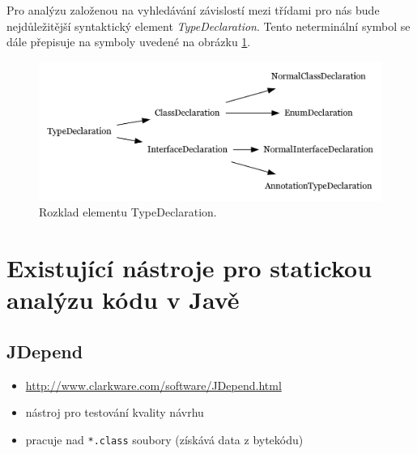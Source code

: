 Pro analýzu založenou na vyhledávání závislostí mezi třídami pro nás bude nejdůležitější syntaktický element \emph{TypeDeclaration}. Tento neterminální symbol se dále přepisuje na symboly uvedené na obrázku \ref{type_declaration_options}.

\begin{figure}[h!]
\centering
\includegraphics[width=\textwidth]{./graphs/toplevel_types.png}
\caption{Rozklad elementu TypeDeclaration.\label{type_declaration_options}}
\end{figure}





\section{Existující nástroje pro statickou analýzu kódu v Javě}

\subsection{JDepend}

\begin{itemize}
\item \href{http://www.clarkware.com/software/JDepend.html}{http://www.clarkware.com/software/JDepend.html}
\item nástroj pro testování kvality návrhu
\item pracuje nad \verb+*.class+ soubory (získává data z bytekódu)
\end{itemize}

